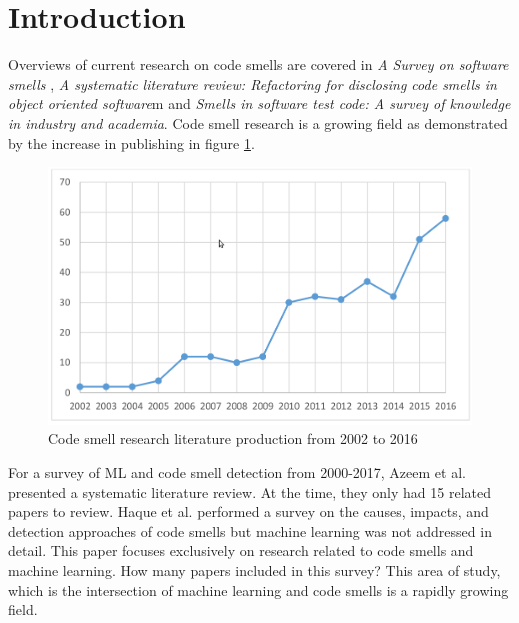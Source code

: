\documentclass[conference]{IEEEtran}
\begin{document}
\section{Introduction}
Overviews of current research on code smells are covered in \textit{A Survey on software smells} \cite{sharma_survey_2018}, \textit{A systematic literature review: Refactoring for disclosing code smells in object oriented software}\cite{singh_systematic_2018}m and \textit{Smells in software test code: A survey of knowledge in industry and
academia}\cite{garousi_smells_2018}. 
Code smell research is a growing field\cite{kokol_code_2018} as demonstrated by the increase in publishing in figure \ref{fig:smellresearch}.
\begin{figure}[!ht]
  \centerline{\includegraphics[width=\textwidth]{Dynamicsofcodesmellresearch.png}}
  \caption{Code smell research literature production from 2002 to 2016\cite{kokol_code_2018}}
  \label{fig:smellresearch}
\end{figure} 
For a survey of ML and code smell detection from 2000-2017, Azeem et al. presented a systematic literature review\cite{azeem_machine_2019}. At the time, they only had 15 related papers to review. Haque et al.\cite{haque_causes_2018} performed a survey on the causes, impacts, and detection approaches of code smells but machine learning was not addressed in detail. This paper focuses exclusively on research related to code smells and machine learning.
How many papers included in this survey?
This area of study, which is the intersection of machine learning and code smells is a rapidly growing field. 
\end{document}
